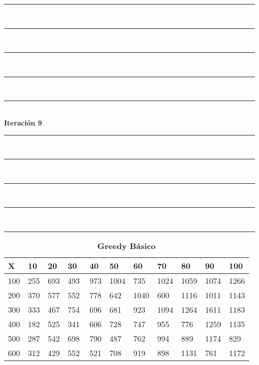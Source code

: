 \documentclass[10pt,letterpaper]{article}
\begin{document}
\newpage 
\begin{center}
\newcommand{\HRule}{\rule{\linewidth}{0.5mm}}
\center
\HRule\\[6cm]
\HRule\\[0.4cm]
\HRule\\[0.4cm]
\HRule\\[0.4cm]
\HRule\\[0.4cm]
{\centering \Huge\bfseries Iteración 9}\\[0.4cm]
\HRule\\[0.4cm]
\HRule\\[0.4cm]
\HRule\\[0.4cm]
\HRule\\[6cm]
\HRule
\end{center}
\newpage 
{}
\begin{center}
\begin{table}\renewcommand{\arraystretch}{2.5}
\caption{\large \textbf{Greedy Básico}}
\centering
\begin{tabular} { |m{0.5cm}|m{1.3cm}|m{1.3cm}|m{1.3cm}|m{1.3cm}|m{1.3cm}|m{1.3cm}|m{1.3cm}|m{1.3cm}|m{1.3cm}|m{1.3cm}|} 
\hline
\rowcolor{Gray}
\centering \textbf{X} & \centering \textbf{10} & \centering \textbf{20} & \centering \textbf{30}\ & \centering \textbf{40} & \centering \textbf{50} & \centering \textbf{60}\ & \centering \textbf{70} & \centering \textbf{80} & \centering \textbf{90}\ & \textbf{100} \\\hline
\cellcolor{Gray}100 & \Large 255 & \Large 693 & \Large 493 & \Large 973 & \Large 1004 & \Large 735 & \Large 1024 & \Large 1059 & \Large 1074 & \Large 1266 \\
\hline
\cellcolor{Gray}200 & \Large 370 & \Large 577 & \Large 552 & \Large 778 & \Large 642 & \Large 1040 & \Large 600 & \Large 1116 & \Large 1011 & \Large 1143 \\
\hline
\cellcolor{Gray}300 & \Large 333 & \Large 467 & \Large 754 & \Large 696 & \Large 681 & \Large 923 & \Large 1094 & \Large 1264 & \Large 1611 & \Large 1183 \\
\hline
\cellcolor{Gray}400 & \Large 182 & \Large 525 & \Large 341 & \Large 606 & \Large 728 & \Large 747 & \Large 955 & \Large 776 & \Large 1259 & \Large 1135 \\
\hline
\cellcolor{Gray}500 & \Large 287 & \Large 542 & \Large 698 & \Large 790 & \Large 487 & \Large 762 & \Large 994 & \Large 889 & \Large 1174 & \Large 829 \\
\hline
\cellcolor{Gray}600 & \Large 312 & \Large 429 & \Large 552 & \Large 521 & \Large 708 & \Large 919 & \Large 898 & \Large 1131 & \Large 761 & \Large 1172 \\

\end{tabular}
\end{table}
\end{center}
\end{document}
